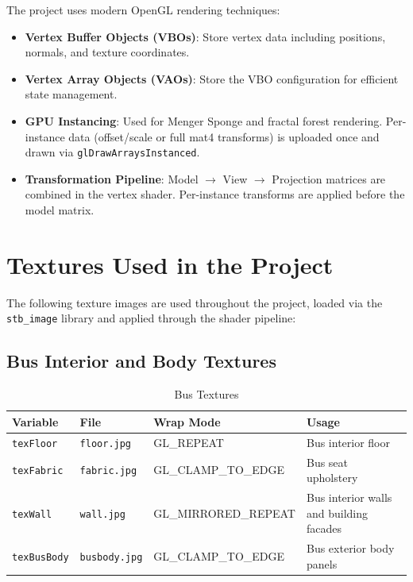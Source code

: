 \documentclass[12pt,a4paper]{article}
\begin{document}
The project uses modern OpenGL rendering techniques:
\begin{itemize}
    \item \textbf{Vertex Buffer Objects (VBOs)}: Store vertex data including positions, normals, and texture coordinates.
    \item \textbf{Vertex Array Objects (VAOs)}: Store the VBO configuration for efficient state management.
    \item \textbf{GPU Instancing}: Used for Menger Sponge and fractal forest rendering. Per-instance data (offset/scale or full mat4 transforms) is uploaded once and drawn via \texttt{glDrawArraysInstanced}.
    \item \textbf{Transformation Pipeline}: Model $\rightarrow$ View $\rightarrow$ Projection matrices are combined in the vertex shader. Per-instance transforms are applied before the model matrix.
\end{itemize}

\section{Textures Used in the Project}

The following texture images are used throughout the project, loaded via the \texttt{stb\_image} library and applied through the shader pipeline:

\subsection{Bus Interior and Body Textures}

\begin{table}[H]
\centering
\begin{tabular}{lllp{5.5cm}}
\toprule
\textbf{Variable} & \textbf{File} & \textbf{Wrap Mode} & \textbf{Usage} \\
\midrule
\texttt{texFloor}     & \texttt{floor.jpg}     & GL\_REPEAT          & Bus interior floor \\
\texttt{texFabric}    & \texttt{fabric.jpg}    & GL\_CLAMP\_TO\_EDGE & Bus seat upholstery \\
\texttt{texWall}      & \texttt{wall.jpg}      & GL\_MIRRORED\_REPEAT & Bus interior walls and building facades \\
\texttt{texBusBody}   & \texttt{busbody.jpg}   & GL\_CLAMP\_TO\_EDGE & Bus exterior body panels \\
\bottomrule
\end{tabular}
\caption{Bus Textures}
\end{table}
\end{document}

